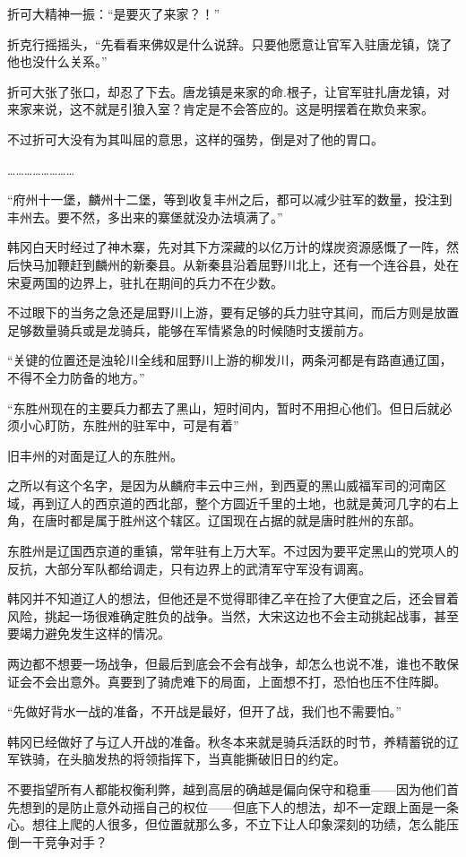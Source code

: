 折可大精神一振：“是要灭了来家？！”

折克行摇摇头，“先看看来佛奴是什么说辞。只要他愿意让官军入驻唐龙镇，饶了他也没什么关系。”

折可大张了张口，却忍了下去。唐龙镇是来家的命.根子，让官军驻扎唐龙镇，对来家来说，这不就是引狼入室？肯定是不会答应的。这是明摆着在欺负来家。

不过折可大没有为其叫屈的意思，这样的强势，倒是对了他的胃口。

……………………

“府州十一堡，麟州十二堡，等到收复丰州之后，都可以减少驻军的数量，投注到丰州去。要不然，多出来的寨堡就没办法填满了。”

韩冈白天时经过了神木寨，先对其下方深藏的以亿万计的煤炭资源感慨了一阵，然后快马加鞭赶到麟州的新秦县。从新秦县沿着屈野川北上，还有一个连谷县，处在宋夏两国的边界上，驻扎在期间的兵力不在少数。

不过眼下的当务之急还是屈野川上游，要有足够的兵力驻守其间，而后方则是放置足够数量骑兵或是龙骑兵，能够在军情紧急的时候随时支援前方。

“关键的位置还是浊轮川全线和屈野川上游的柳发川，两条河都是有路直通辽国，不得不全力防备的地方。”

“东胜州现在的主要兵力都去了黑山，短时间内，暂时不用担心他们。但日后就必须小心盯防，东胜州的驻军中，可是有着”

旧丰州的对面是辽人的东胜州。

之所以有这个名字，是因为从麟府丰云中三州，到西夏的黑山威福军司的河南区域，再到辽人的西京道的西北部，整个方圆近千里的土地，也就是黄河几字的右上角，在唐时都是属于胜州这个辖区。辽国现在占据的就是唐时胜州的东部。

东胜州是辽国西京道的重镇，常年驻有上万大军。不过因为要平定黑山的党项人的反抗，大部分军队都给调走，只有边界上的武清军守军没有调离。

韩冈并不知道辽人的想法，但他还是不觉得耶律乙辛在捡了大便宜之后，还会冒着风险，挑起一场很难确定胜负的战争。当然，大宋这边也不会主动挑起战事，甚至要竭力避免发生这样的情况。

两边都不想要一场战争，但最后到底会不会有战争，却怎么也说不准，谁也不敢保证会不会出意外。真要到了骑虎难下的局面，上面想不打，恐怕也压不住阵脚。

“先做好背水一战的准备，不开战是最好，但开了战，我们也不需要怕。”

韩冈已经做好了与辽人开战的准备。秋冬本来就是骑兵活跃的时节，养精蓄锐的辽军铁骑，在头脑发热的将领指挥下，当真能撕破旧日的约定。

不要指望所有人都能权衡利弊，越到高层的确越是偏向保守和稳重——因为他们首先想到的是防止意外动摇自己的权位——但底下人的想法，却不一定跟上面是一条心。想往上爬的人很多，但位置就那么多，不立下让人印象深刻的功绩，怎么能压倒一干竞争对手？

